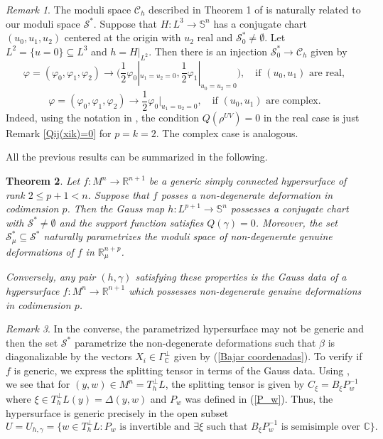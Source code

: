 \documentclass{article}
\newtheorem{thm}{Theorem}[section]
\theoremstyle{remark}
\newtheorem{remark}[thm]{Remark}
\begin{document}
\begin{remark}\label{relacion caso p=2 con trabajo dft}
The moduli space $\mathcal{C}_h$ described in Theorem 1 of \cite{DFT} is naturally related to our moduli space $\mathcal{S}^*$. 
Suppose that $H:L^3\rightarrow\mathbb{S}^n$ has a conjugate chart $(u_0,u_1,u_2)$ centered at the origin with $u_2$ real and $\mathcal{S}_{0}^*\neq\emptyset$. Let $L^2=\{u=0\}\subseteq L^3$ and  $h=H|_{L^2}$. Then there is an injection $\mathcal{S}_{0}^*\rightarrow\mathcal{C}_h$ given by
    $$\varphi=(\varphi_0,\varphi_1,\varphi_2)\rightarrow \Big(\frac{1}{2}\varphi_0|_{u_1=u_2=0},\frac{1}{2}\varphi_1|_{u_0=u_2=0}\Big),\quad\text{if } (u_0,u_1) \text{ are real},$$
    $$\varphi=(\varphi_0,\varphi_1,\varphi_2)\rightarrow \frac{1}{2}\varphi_0|_{u_1=u_2=0},\quad\text{if } (u_0,u_1) \text{ are complex}.$$
    Indeed, using the notation in \cite{DFT}, the condition $Q(\rho^{UV})=0$ in the real case is just Remark \ref{Qij(xik)=0} for $p=k=2$. The complex case is analogous.
\end{remark}

All the previous results can be summarized in the following.
\begin{thm}\label{Teorema principal de Sbrana Cartan}
    Let $f:M^n\rightarrow \mathbb{R}^{n+1}$ be a generic simply connected hypersurface of rank $2\leq p+1<n$. Suppose that $f$ posses a non-degenerate deformation in codimension $p$. Then the Gauss map $h:L^{p+1}\rightarrow\mathbb{S}^n$ possesses a conjugate chart with $\mathcal{S}^{*}\neq\emptyset$ and the support function satisfies $Q(\gamma)=0$. Moreover, the set $\mathcal{S}_\mu^{*}\subseteq\mathcal{S}^{*}$ naturally parametrizes the moduli space of non-degenerate genuine deformations of $f$ in $\mathbb{R}^{n+p}_{\mu}$. 
    
    Conversely, any pair $(h,\gamma)$ satisfying these properties is the Gauss data of a hypersurface $f:M^n\rightarrow\mathbb{R}^{n+1}$ which possesses non-degenerate genuine deformations in codimension $p$. 
\end{thm}
\begin{remark}
    In the converse, the parametrized hypersurface may not be generic and then the set $\mathcal{S}^{*}$ parametrize the non-degenerate deformations such that $\beta$ is diagonalizable by the vectors $X_i\in\Gamma_{\mathbb{C}}^\perp$ given by (\ref{Bajar coordenadas}). To verify if $f$ is generic, we express the splitting tensor in terms of the Gauss data. Using \cite{DG}, we see that for $(y,w)\in M^n=T^\perp_h L$, the splitting tensor is given by $C_\xi=B_\xi P_w^{-1}$ where $\xi\in T^\perp_hL(y)=\Delta(y,w)$ and $P_w$ was defined in (\ref{P_w}). Thus, the hypersurface is generic precisely in the open subset
    $$U=U_{h,\gamma}=\{w\in T^{\perp}_hL: P_w\text{ is invertible and }\exists\xi \text{ such that } B_\xi P_w^{-1} \text{ is semisimple over }\mathbb{C} \}.$$
\end{remark}
\end{document}
